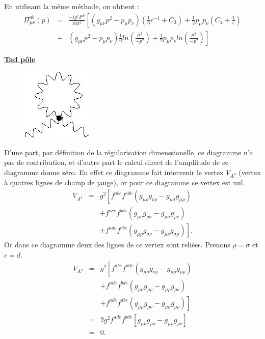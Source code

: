 \documentclass[a4paper,11pt]{article}
\theoremstyle{plain}
\theoremstyle{definition}
\theoremstyle{remark}
\numberwithin{equation}{section}
\numberwithin{equation}{subsection}
\numberwithin{figure}{section}
\begin{document}
\noindent
En utilisant la même méthode, on obtient : 
\begin{eqnarray}
\Pi^{ab}_{\mu\nu}(p) &=& \frac{-i g^2 \delta^{ab}}{16 \pi^{2}} \left[
\left( g_{\mu\nu}p^2 - p_{\mu}p_{\nu} \right) \left( \frac{1}{6} \epsilon^{-1} + C_3 \right)
+ \frac{1}{2} p_{\mu} p_{\nu} ( C_4 + \frac{1}{\epsilon} ) \right.\\ 
    &+& \left. \left( g_{\mu \nu} p^2 - p_{\mu} p_{\nu} \right) \frac{1}{6} ln(\frac{\mu^2}{-p^2})
+\frac{1}{2} p_{\mu} p_{\nu}  ln( \frac{\mu^2}{- p^2} ) \right]
\end{eqnarray}

\noindent
\underline{\textbf{Tad pôle}}
\begin{figure}[H]
 \begin{center}
  \includegraphics[scale=0.4]{1_loop_1_vert_3A.jpg}
 \end{center}
\end{figure}

\noindent
D'une part, par définition de la régularisation dimenssionelle, ce diagramme n'a pas de contribution, 
et d'autre part le calcul direct de l'amplitude de ce diagramme donne zéro. En effet ce diagramme fait intervenir le vertex $V_{A^{4}}$ 
(vertex à quatres lignes de champ de jauge), or pour ce diagramme ce vertex est nul. 
\begin{eqnarray}
 V_{A^{4}} &=& g^{2} \left[ f^{abe} f^{cde} \left( g_{\mu \rho}g_{\nu \rho} - g_{\mu \sigma}g_{\mu \rho} \right) \right. \nonumber  \\
&& + f^{ace} f^{bde} \left( g_{\mu \nu}g_{\rho \sigma} - g_{\mu \sigma}g_{\rho \nu} \right) \nonumber  \\
&& \left. +f^{ade} f^{cbe} \left( g_{\mu \rho}g_{\sigma \nu} - g_{\mu \nu}g_{\sigma \rho} \right) \right] .  
\end{eqnarray}
Or dans ce diagramme deux des lignes de ce vertex sont reliées. Prenons $\rho=\sigma$ et $c=d$.
\begin{eqnarray}
 V_{A^{4}} &=& g^{2} \left[ f^{abe} f^{dde} \left( g_{\mu \rho}g_{\nu \rho} - g_{\mu \rho}g_{\mu \rho} \right) \right. \nonumber  \\
&& + f^{ade} f^{bde} \left( g_{\mu \nu}g_{\rho \rho} - g_{\mu \rho}g_{\rho \nu} \right) \nonumber  \\
&& \left. +f^{ade} f^{dbe} \left( g_{\mu \rho}g_{\rho \nu} - g_{\mu \nu}g_{\rho \rho} \right) \right]  \\
           &=& 2 g^{2} f^{ade} f^{bde} \left[  g_{\mu \nu}g_{\rho \rho} - g_{\mu \rho}g_{\rho \nu} \right]  \\
           &=& 0 .
\end{eqnarray}
\end{document}
